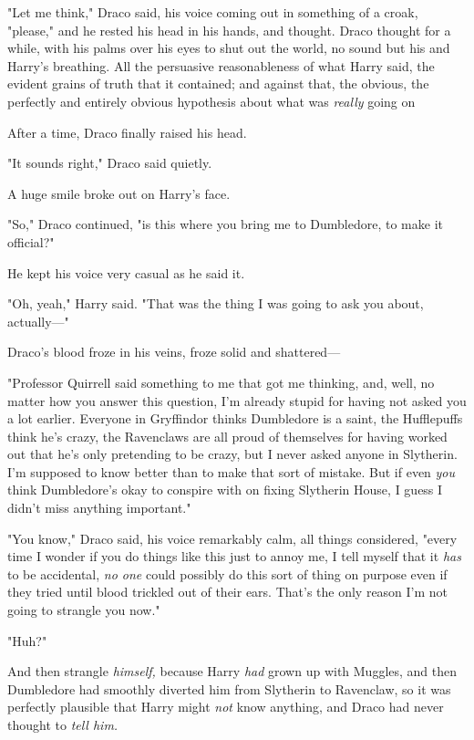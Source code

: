 "Let me think," Draco said, his voice coming out in something of a croak,
"please," and he rested his head in his hands, and thought.
\sbreak
Draco thought for a while, with his palms over his eyes to shut out the world,
no sound but his and Harry's breathing. All the persuasive reasonableness of
what Harry said, the evident grains of truth that it contained; and against
that, the obvious, the perfectly and entirely obvious hypothesis about what was
\emph{really} going on{\el}

After a time, Draco finally raised his head.

"It sounds right," Draco said quietly.

A huge smile broke out on Harry's face.

"So," Draco continued, "is this where you bring me to Dumbledore, to make it
official?"

He kept his voice very casual as he said it.

"Oh, yeah," Harry said. "That was the thing I was going to ask you about,
actually\mbox{---}"

Draco's blood froze in his veins, froze solid and shattered---

"Professor Quirrell said something to me that got me thinking, and, well, no
matter how you answer this question, I'm already stupid for having not asked
you a lot earlier. Everyone in Gryffindor thinks Dumbledore is a saint, the
Hufflepuffs think he's crazy, the Ravenclaws are all proud of themselves for
having worked out that he's only pretending to be crazy, but I never asked
anyone in Slytherin. I'm supposed to know better than to make that sort of
mistake. But if even \emph{you} think Dumbledore's okay to conspire with on
fixing Slytherin House, I guess I didn't miss anything important."

{\el}

{\el}

{\el}

"You know," Draco said, his voice remarkably calm, all things considered,
"every time I wonder if you do things like this just to annoy me, I tell myself
that it \emph{has} to be accidental, \emph{no one} could possibly do this sort
of thing on purpose even if they tried until blood trickled out of their ears.
That's the only reason I'm not going to strangle you now."

"Huh?"

And then strangle \emph{himself,} because Harry \emph{had} grown up with
Muggles, and then Dumbledore had smoothly diverted him from Slytherin to
Ravenclaw, so it was perfectly plausible that Harry might \emph{not} know
anything, and Draco had never thought to \emph{tell him.}

